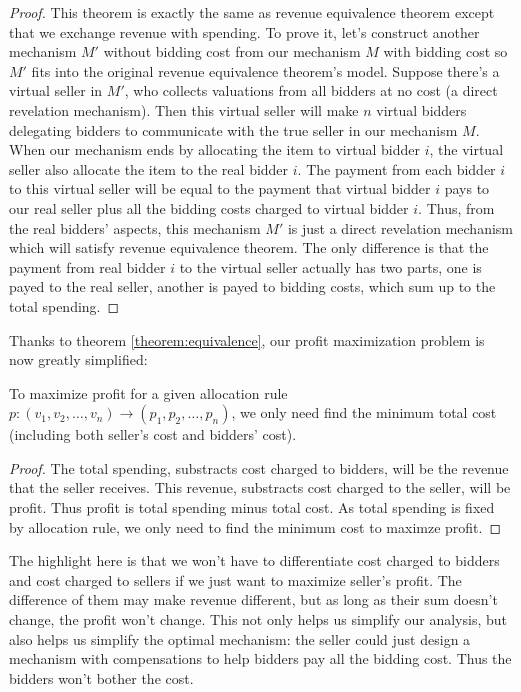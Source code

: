 \begin{proof}
This theorem is exactly the same as revenue equivalence theorem except that we
exchange revenue with spending. To prove it, let's construct another mechanism
$M'$ without bidding cost from our mechanism $M$ with bidding cost so $M'$ fits
into the original revenue equivalence theorem's model. Suppose there's a
virtual seller in $M'$, who collects valuations from all bidders at no cost (a
direct revelation mechanism). Then this virtual seller will make $n$ virtual
bidders delegating bidders to communicate with the true seller in our mechanism
$M$.  When our mechanism ends by allocating the item to virtual bidder $i$, the
virtual seller also allocate the item to the real bidder $i$. The payment from
each bidder $i$ to this virtual seller will be equal to the payment that
virtual bidder $i$ pays to our real seller plus all the bidding costs charged
to virtual bidder $i$. Thus, from the real bidders' aspects, this mechanism
$M'$ is just a direct revelation mechanism which will satisfy revenue
equivalence theorem. The only difference is that the payment from real bidder
$i$ to the virtual seller actually has two parts, one is payed to the real
seller, another is payed to bidding costs, which sum up to the total spending.
\end{proof}

Thanks to theorem \ref{theorem:equivalence}, our profit maximization problem
is now greatly simplified: 

\begin{corollary}
To maximize profit for a given allocation rule $p: (v_1, v_2, \ldots, v_n)
\rightarrow (p_1, p_2, \ldots, p_n)$, we only need find the minimum total cost
(including both seller's cost and bidders' cost).
\end{corollary}

\begin{proof}
The total spending, substracts cost charged to bidders, will be the revenue
that the seller receives.  This revenue, substracts cost charged to the seller,
will be profit. Thus profit is total spending minus total cost. As total
spending is fixed by allocation rule, we only need to find the minimum cost to
maximze profit.
\end{proof}

The highlight here is that we won't have to differentiate cost charged to
bidders and cost charged to sellers if we just want to maximize seller's profit.
The difference of them may make revenue different, but as long as their sum
doesn't change, the profit won't change. This not only helps us simplify our
analysis, but also helps us simplify the optimal mechanism: the seller could
just design a mechanism with compensations to help bidders pay all the bidding
cost. Thus the bidders won't bother the cost.

